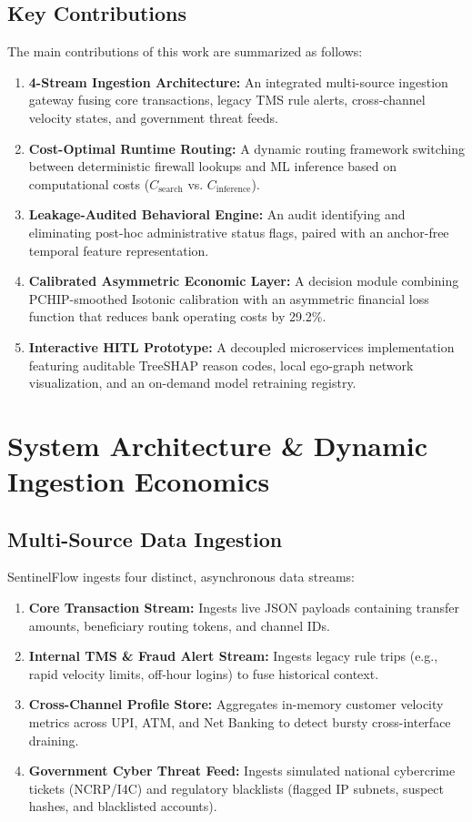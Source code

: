 \documentclass[conference]{IEEEtran}
\begin{document}
\subsection{Key Contributions}
The main contributions of this work are summarized as follows:
\begin{enumerate}
    \item \textbf{4-Stream Ingestion Architecture:} An integrated multi-source ingestion gateway fusing core transactions, legacy TMS rule alerts, cross-channel velocity states, and government threat feeds.
    \item \textbf{Cost-Optimal Runtime Routing:} A dynamic routing framework switching between deterministic firewall lookups and ML inference based on computational costs ($C_{\text{search}}$ vs. $C_{\text{inference}}$).
    \item \textbf{Leakage-Audited Behavioral Engine:} An audit identifying and eliminating post-hoc administrative status flags, paired with an anchor-free temporal feature representation.
    \item \textbf{Calibrated Asymmetric Economic Layer:} A decision module combining PCHIP-smoothed Isotonic calibration with an asymmetric financial loss function that reduces bank operating costs by 29.2\%.
    \item \textbf{Interactive HITL Prototype:} A decoupled microservices implementation featuring auditable TreeSHAP reason codes, local ego-graph network visualization, and an on-demand model retraining registry.
\end{enumerate}

\section{System Architecture \& Dynamic Ingestion Economics}

\subsection{Multi-Source Data Ingestion}
SentinelFlow ingests four distinct, asynchronous data streams:
\begin{enumerate}
    \item \textbf{Core Transaction Stream:} Ingests live JSON payloads containing transfer amounts, beneficiary routing tokens, and channel IDs.
    \item \textbf{Internal TMS \& Fraud Alert Stream:} Ingests legacy rule trips (e.g., rapid velocity limits, off-hour logins) to fuse historical context.
    \item \textbf{Cross-Channel Profile Store:} Aggregates in-memory customer velocity metrics across UPI, ATM, and Net Banking to detect bursty cross-interface draining.
    \item \textbf{Government Cyber Threat Feed:} Ingests simulated national cybercrime tickets (NCRP/I4C) and regulatory blacklists (flagged IP subnets, suspect hashes, and blacklisted accounts).
\end{enumerate}
\end{document}
